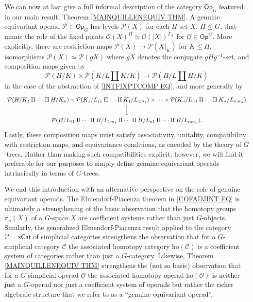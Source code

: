 \documentclass[a4paper,10pt
,draft
]{article}%
\numberwithin{equation}{section}
\numberwithin{figure}{section}
\theoremstyle{definition} %
\renewcommand{\O}{\ensuremath{\mathcal O}}
\renewcommand{\P}{\ensuremath{\mathcal P}}
\newcommand{\C}{\ensuremath{\mathcal C}}
\newcommand{\1}{\ensuremath{\mathbbm 1}}%
\begin{document}
We can now at last give a full informal description of the category $\mathsf{Op}_G$ featured in 
our main result, Theorem \ref{MAINQUILLENEQUIV THM}.
A genuine equivariant operad
$\mathcal{P} \in \mathsf{Op}_G$
has levels $\mathcal{P}(X)$ for each $H$-set $X$, $H\leq G$, 
that mimic the role of the fixed points $\O(X)^H \simeq \O(|X|)^{\Gamma_X}$ for 
$\mathcal{O} \in \mathsf{Op}^G$.
More explicitly, there are restriction maps 
$\mathcal{P}(X) \to \mathcal{P}(X|_{K})$ for $K \leq H$,
isomorphisms
$\mathcal{P}(X)\simeq \mathcal{P}(g X)$
where $gX$ denotes the conjugate $gHg^{-1}$-set,
and composition maps given by
\[
\P(H/K) \times \P(K/L \amalg K/K) \to \P(H/L \amalg H/K)
\]
in the case of the abstraction of \eqref{INTFIXPTCOMP EQ}, and more generally by
\begin{equation}\label{GENGENMULT EQ}
\begin{tikzcd}
  \mathcal{P}(H/K_1 \amalg \cdots \amalg H/K_n)
  \times
  \mathcal{P}(K_1 / L_{11} \amalg \cdots \amalg K_1/L_{1 m_1})
  \times \cdots \times
  \mathcal{P}(K_n / L_{n1} \amalg \cdots \amalg K_n / L_{n m_n})
  \arrow[d]
  \\
  \mathcal{P}(H / L_{11} \amalg \cdots \amalg H/L_{1 m_1}
  \amalg \cdots \amalg
  H / L_{n1} \amalg \cdots \amalg H/L_{n m_n}
  ).
\end{tikzcd}
\end{equation}
Lastly, these composition maps %
must satisfy associativity, unitality, compatibility with restriction maps, and equivariance conditions, as encoded by the theory of $G$-trees. 
Rather than making such compatibilities explicit, however, we will find it preferable for our purposes to simply define genuine equivariant operads intrinsically in terms of $G$-trees.


We end this introduction with an alternative perspective on the role of genuine equivariant operads.
The Elmendorf-Piacenza theorem in 
\eqref{COFADJINT EQ}
is ultimately a strengthening of the basic observation that the homotopy groups
$\pi_n(X)$ of a $G$-space $X$ are coefficient systems rather than just $G$-objects.
Similarly, the generalized 
Elmendorf-Piacenza result \cite[Thm. 3.17]{Ste16}
applied to the category 
$\mathcal{V}=\mathsf{sCat}$
of simplicial categories strengthens 
the observation that 
for a $G$-simplicial category $\C$
the associated homotopy category
$\text{ho}(\mathcal{C})$
is a coefficient system of categories rather than just a $G$-category.
Likewise, Theorem \ref{MAINQUILLENEQUIV THM}
strengthens the (not so basic) observation that for a $G$-simplicial operad $\O$ the associated homotopy operad 
$\text{ho}(\mathcal{O})$
is neither just a $G$-operad nor 
just a coefficient system of operads
but rather the richer algebraic structure that we refer to as a ``genuine equivariant operad''.
\end{document}
